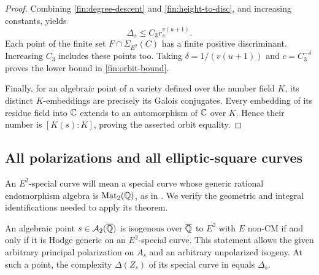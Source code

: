 \begin{proof}
Combining \eqref{fin:degree-descent} and
\eqref{fin:height-to-disc}, and increasing constants, yields
\[
 \Delta_s\leq C_3 r_s^{v(u+1)}.
\]
Each point of the finite set $F\cap\Sigma_{E^2}(C)$ has a finite
positive discriminant.  Increasing $C_3$ includes these points too.
Taking $\delta=1/(v(u+1))$ and $c=C_3^{-\delta}$ proves the lower
bound in \eqref{fin:orbit-bound}.

Finally, for an algebraic point of a variety defined over the number
field $K$, its distinct $K$-embeddings are precisely its Galois
conjugates.  Every embedding of its residue field into $\mathbb C$ extends
to an automorphism of $\mathbb C$ over $K$.  Hence their number is
$[K(s):K]$, proving the asserted orbit equality.
\end{proof}

\subsection{All polarizations and all elliptic-square curves}

An $E^2$-special curve will mean a special curve whose generic rational
endomorphism algebra is $\operatorname{Mat}_2(\mathbb Q)$, as in
\cite[\S6.2]{DawOrr2022}.  We verify the geometric and integral
identifications needed to apply its theorem.

\begin{proposition}\label{fin:squares}
An algebraic point $s\in\mathcal A_2(\overline{\mathbb Q})$ is isogenous over $\overline{\mathbb Q}$ to
$E^2$ with $E$ non-CM if and only if it is Hodge generic on an
$E^2$-special curve.  This statement allows the given arbitrary
principal polarization on $A_s$ and an arbitrary unpolarized isogeny.
At such a point, the complexity $\Delta(Z_s)$ of its special curve
in \cite[\S6.3]{DawOrr2022} equals $\Delta_s$.
\end{proposition}

